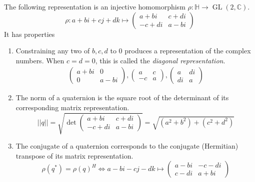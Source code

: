 \documentclass{article}
\DeclareMathOperator{\GL}{GL}
\begin{document}
      \begin{proposition}
        The following representation is an injective homomorphism $\rho: \mathbb{H} \longrightarrow \GL(2, \mathbb{C})$. 
        \begin{equation}
          \rho: a + bi + cj + dk \mapsto \begin{pmatrix}
          a+bi & c+ di \\ -c + di & a - bi
          \end{pmatrix}
        \end{equation}
        It has properties
        \begin{enumerate}
          \item Constraining any two of $b, c, d$ to $0$ produces a representation of the complex numbers. When $c = d = 0$, this is called the \textit{diagonal representation}. 
          \begin{align*}
            \begin{pmatrix}
            a+bi & 0 \\ 0 & a-bi
            \end{pmatrix},  \begin{pmatrix}
            a & c \\ -c & a
            \end{pmatrix},  \begin{pmatrix}
            a & di \\ di & a
            \end{pmatrix}
          \end{align*}
          \item The norm of a quaternion is the square root of the determinant of its corresponding matrix representation. 
            \begin{equation}
              ||q|| = \sqrt{\det \begin{pmatrix}
              a+bi & c+di \\ -c+di & a-bi
              \end{pmatrix}} = \sqrt{(a^2 + b^2) + (c^2 + d^2)}
            \end{equation}
          \item The conjugate of a quaternion corresponds to the conjugate (Hermitian) transpose of its matrix representation. 
            \begin{equation}
              \rho(q^*) = \rho(q)^H \iff a-bi-cj-dk \mapsto \begin{pmatrix}
              a-bi & -c-di \\ c-di & a+bi

\end{pmatrix}
\end{equation}
\end{enumerate}
\end{proposition}
\end{document}
